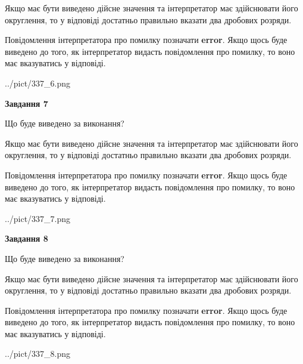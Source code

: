 \documentclass[12pt, ukrainian]{article}
\begin{document}
{\begin {Large}
Якщо має бути виведено дійсне значення та інтерпретатор має здійснювати його округлення, 
то у відповіді достатньо правильно вказати два дробових розряди.

Повідомлення інтерпретатора про помилку позначати \textbf{error}.
Якщо щось буде виведено до того, як інтерпретатор видасть повідомлення про помилку, 
то воно має вказуватись у відповіді. \par

\begin{center}
	{../pict/337_6.png}
\end{center}
\newpage

{\begin {center}\textbf{Завдання 7}\end {center}}\par
Що буде виведено за виконання? \par

Якщо має бути виведено дійсне значення та інтерпретатор має здійснювати його округлення, 
то у відповіді достатньо правильно вказати два дробових розряди.

Повідомлення інтерпретатора про помилку позначати \textbf{error}.
Якщо щось буде виведено до того, як інтерпретатор видасть повідомлення про помилку, 
то воно має вказуватись у відповіді. \par

\begin{center}
	{../pict/337_7.png}
\end{center}
\newpage

{\begin {center}\textbf{Завдання 8}\end {center}}\par
Що буде виведено за виконання? \par

Якщо має бути виведено дійсне значення та інтерпретатор має здійснювати його округлення, 
то у відповіді достатньо правильно вказати два дробових розряди.

Повідомлення інтерпретатора про помилку позначати \textbf{error}.
Якщо щось буде виведено до того, як інтерпретатор видасть повідомлення про помилку, 
то воно має вказуватись у відповіді. \par

\begin{center}
	{../pict/337_8.png}
\end{center}
\newpage


\end{Large}}
\end{document}
